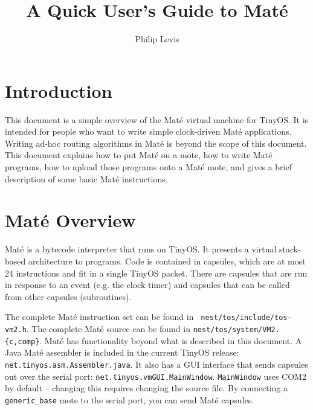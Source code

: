 \documentclass[10pt]{article}
\def\Mate{{Mat\'{e} }}
\begin{document}
\fontsize{10}{10}                               %

\title{A Quick User's Guide to \Mate}
\author{Philip Levis}
\maketitle

\fontsize{10}{10}                               %

\section*{Introduction}

This document is a simple overview of the \Mate virtual machine for
TinyOS. It is intended for people who want to write simple
clock-driven \Mate applications. Writing ad-hoc routing algorithms in
\Mate is beyond the scope of this document. This document explains how
to put \Mate on a mote, how to write \Mate programs, how to upload
those programs onto a \Mate mote, and gives a brief description of
some basic \Mate instructions.

\section*{\Mate Overview}

\Mate is a bytecode interpreter that runs on TinyOS. It presents a
virtual stack-based architecture to programs. Code is contained in
capsules, which are at most 24 instructions and fit in a single TinyOS
packet. There are capsules that are run in response to an event
(e.g. the clock timer) and capsules that can be called from other
capsules (subroutines).

The complete \Mate instruction set can be found in {\tt
nest/tos/include/tos-vm2.h}. The complete \Mate source can be found in
{\tt nest/tos/system/VM2.\{c,comp\}}. \Mate has functionality beyond
what is described in this document. A Java \Mate assembler is included
in the current TinyOS release: {\tt net.tinyos.asm.Assembler.java}. It
also has a GUI interface that sends capsules out over the serial port:
{\tt net.tinyos.vmGUI.MainWindow}. {\tt MainWindow} uses COM2 by
default -- changing this requires changing the source file. By
connecting a {\tt generic\_base} mote to the serial port, you can send
\Mate capsules.
\end{document}
